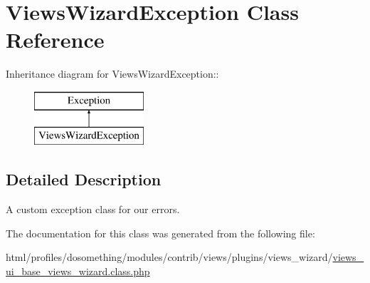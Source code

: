 \hypertarget{classViewsWizardException}{
\section{ViewsWizardException Class Reference}
\label{classViewsWizardException}
}
Inheritance diagram for ViewsWizardException::\begin{figure}[H]
\begin{center}
\leavevmode
\includegraphics[height=2cm]{classViewsWizardException}
\end{center}
\end{figure}


\subsection{Detailed Description}
A custom exception class for our errors. 

The documentation for this class was generated from the following file:\begin{DoxyCompactItemize}
\item 
html/profiles/dosomething/modules/contrib/views/plugins/views\_\-wizard/\hyperlink{views__ui__base__views__wizard_8class_8php}{views\_\-ui\_\-base\_\-views\_\-wizard.class.php}\end{DoxyCompactItemize}
